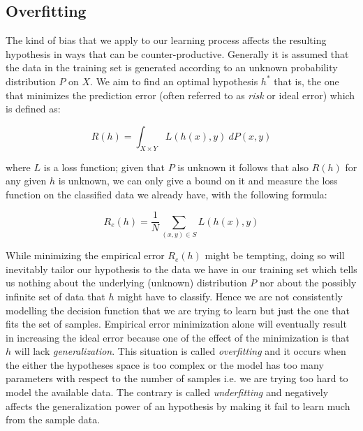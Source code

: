\subsection{Overfitting}
The kind of bias that we apply to our learning process affects the resulting
hypothesis in ways that can be counter-productive.
Generally it is assumed that the data in the training set is generated according
to an unknown probability distribution $P$ on $X$.
We aim to find an optimal hypothesis $h^*$ that is, the one that minimizes the
prediction error (often referred to as \emph{risk} or ideal error) which is
defined as:

\[R(h)=\int_{X\times Y} L(h(x),y)~dP(x,y)\]

where $L$ is a loss function; given that $P$ is unknown it follows that also
$R(h)$ for any given $h$ is unknown, we can only give a bound on it and measure
the loss function on the classified data we already have, with the following
formula:

\[R_e(h)=\frac{1}{N} \sum_{(x,y) \in S} L(h(x),y)\]

While minimizing the empirical error $R_e(h)$ might be tempting, doing so will
inevitably tailor our hypothesis to the data we have in our training set which
tells us nothing about the underlying (unknown) distribution $P$ nor about the 
possibly infinite set of data that $h$ might have to classify.
Hence we are not consistently modelling the decision function that we are trying
to learn but just the one that fits the set of samples.
Empirical error minimization alone will eventually result in increasing the ideal
error because one of the effect of the minimization is that $h$ will lack
\emph{generalization}.
This situation is called \emph{overfitting} and it occurs when the either the
hypotheses space is too complex or the model has too many parameters with
respect to the number of samples i.e. we are trying too hard to model the
available data.
The contrary is called \emph{underfitting} and negatively affects the
generalization power of an hypothesis by making it fail to learn much from the
sample data.

